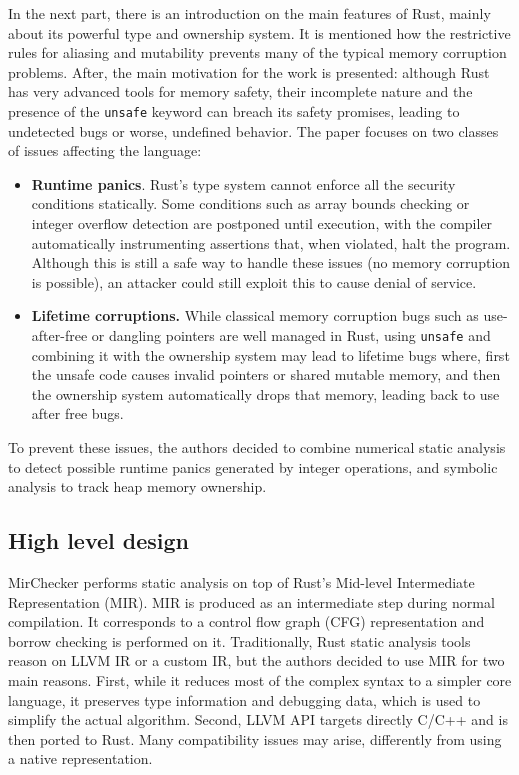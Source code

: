 \documentclass{article}
\begin{document}
In the next part, there is an introduction on the  main features of Rust, mainly about its 
powerful type and ownership system. It is mentioned how the restrictive rules for aliasing and mutability prevents many of the typical memory corruption problems. After, the main motivation for the work is presented: although 
Rust has very advanced tools for memory safety, their incomplete nature and the presence of the \texttt{unsafe} keyword  can breach its safety promises, leading  to undetected bugs or worse, undefined behavior. The paper focuses on two 
classes of issues affecting the language: \begin{itemize}
    \item \textbf{Runtime panics}.  Rust's type system cannot enforce all the security conditions statically. Some conditions such as array bounds checking or integer overflow detection are postponed until execution, with 
    the compiler automatically instrumenting assertions that, when violated, halt the program. Although this is still a safe way to handle these issues (no memory corruption is possible), an attacker could still exploit this 
    to cause denial of service.
    \item \textbf{Lifetime corruptions.} While  classical memory corruption bugs such as use-after-free or dangling pointers are well managed in Rust, using \texttt{unsafe} and combining 
    it with the ownership system may lead to lifetime bugs where, first the unsafe code  causes invalid pointers or shared mutable memory, and then the ownership system automatically drops that memory, leading back to use after free bugs.
\end{itemize}
To prevent these issues, the authors decided to combine numerical static analysis to detect possible runtime panics generated by integer operations,
 and symbolic analysis to track heap memory ownership.
\subsection{High level design}
MirChecker performs static analysis on top of Rust's Mid-level Intermediate Representation (MIR). MIR is produced as an intermediate step during normal compilation. 
It corresponds to a control flow graph (CFG) representation  and borrow checking is performed on it. Traditionally, Rust static analysis tools reason on LLVM IR or  a custom IR, but the authors decided to use MIR 
for two main reasons. First, while it reduces most of the complex syntax to a simpler core language, it preserves type information and debugging data, which is used to simplify the actual algorithm.
Second, LLVM API targets directly C/C++ and is then ported to Rust. Many compatibility issues may arise, differently from using 
a native representation. 
\end{document}

